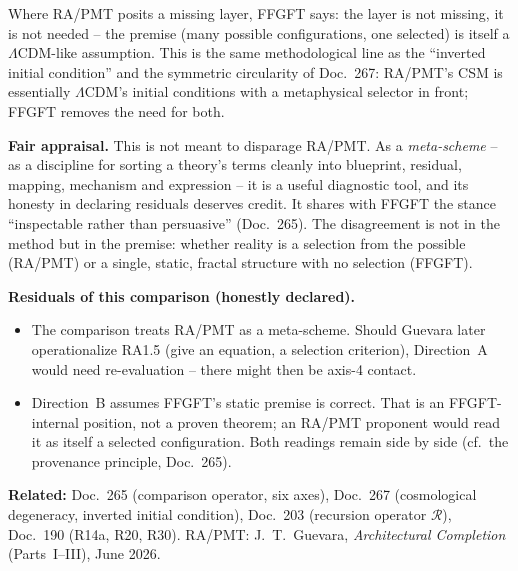 \noindent Where RA/PMT posits a missing layer, FFGFT says: the layer is
not missing, it is not needed -- the premise (many possible
configurations, one selected) is itself a $\Lambda$CDM-like assumption.
This is the same methodological line as the ``inverted initial
condition'' and the symmetric circularity of Doc.~267: RA/PMT's CSM is
essentially $\Lambda$CDM's initial conditions with a metaphysical
selector in front; FFGFT removes the need for both.

\textbf{Fair appraisal.} This is not meant to disparage RA/PMT. As a
\emph{meta-scheme} -- as a discipline for sorting a theory's terms
cleanly into blueprint, residual, mapping, mechanism and expression --
it is a useful diagnostic tool, and its honesty in declaring residuals
deserves credit. It shares with FFGFT the stance ``inspectable rather
than persuasive'' (Doc.~265). The disagreement is not in the method but
in the premise: whether reality is a selection from the possible
(RA/PMT) or a single, static, fractal structure with no selection
(FFGFT).

\textbf{Residuals of this comparison (honestly declared).}
\begin{itemize}
  \item The comparison treats RA/PMT as a meta-scheme. Should Guevara
        later operationalize RA1.5 (give an equation, a selection
        criterion), Direction~A would need re-evaluation -- there might
        then be axis-4 contact.
  \item Direction~B assumes FFGFT's static premise is correct. That is
        an FFGFT-internal position, not a proven theorem; an RA/PMT
        proponent would read it as itself a selected configuration. Both
        readings remain side by side (cf.\ the provenance principle,
        Doc.~265).
\end{itemize}

\noindent\textbf{Related:} Doc.~265 (comparison operator, six axes),
Doc.~267 (cosmological degeneracy, inverted initial condition),
Doc.~203 (recursion operator $\mathcal{R}$), Doc.~190 (R14a, R20, R30).
RA/PMT: J.~T.~Guevara, \emph{Architectural Completion} (Parts~I--III),
June 2026.
